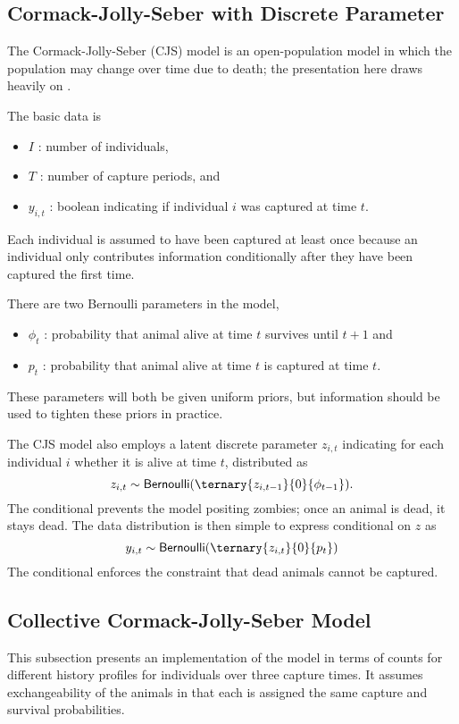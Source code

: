 \subsection{Cormack-Jolly-Seber with Discrete Parameter}

The Cormack-Jolly-Seber (CJS) model
\citep{Cormack:1964,Jolly:1965,Seber:1965} is an open-population model
in which the population may change over time due to death; the
presentation here draws heavily on \citep{Schofield:2007}.  

The basic data is
%
\begin{itemize}
\item $I$ : number of individuals, 
\item $T$ : number of capture periods, and
\item $y_{i,t}$ : boolean indicating if individual $i$ was captured at
  time $t$.
\end{itemize}
%
Each individual is assumed to have been captured at least once because
an individual only contributes information conditionally after they
have been captured the first time.

There are two Bernoulli parameters in the model,
%
\begin{itemize}
\item $\phi_t$ : probability that animal alive at time $t$ survives
  until $t + 1$ and
\item $p_t$ : probability that animal alive at time $t$ is captured at
  time $t$.
\end{itemize}
%
These parameters will both be given uniform priors, but information
should be used to tighten these priors in practice.

The CJS model also employs a latent discrete parameter $z_{i,t}$
indicating for each individual $i$ whether it is alive at time $t$,
distributed as
%
\[
z_{i,t} \sim \distro{Bernoulli}(\ternary{z_{i,t-1}}{0}{\phi_{t-1}}).
\]
%
The conditional prevents the model positing zombies; once an animal is
dead, it stays dead.  The data distribution is then simple to express
conditional on $z$ as
%
\[
y_{i,t} \sim \distro{Bernoulli}(\ternary{z_{i,t}}{0}{p_t})
\]
%
The conditional enforces the constraint that dead animals cannot be captured.


\subsection{Collective Cormack-Jolly-Seber Model}

This subsection presents an implementation of the model in terms of
counts for different history profiles for individuals over three
capture times. It assumes exchangeability of the animals in that each
is assigned the same capture and survival probabilities.

